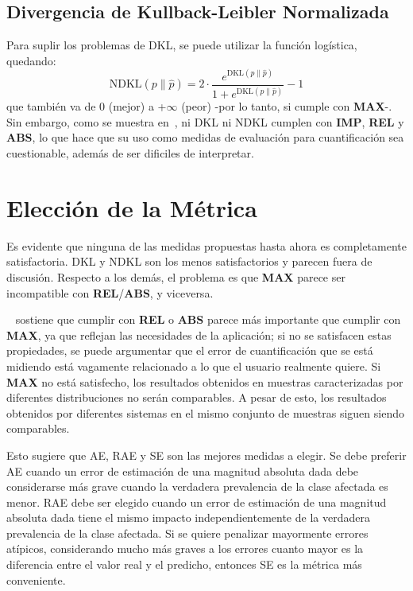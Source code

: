 \subsection{Divergencia de Kullback-Leibler Normalizada}

Para suplir los problemas de DKL, se puede utilizar la función logística,
quedando:
\begin{equation}
    {\text{NDKL}}(p\parallel \hat{p}) = 2 \cdot \frac{e^{{\text{DKL}}(p\parallel \hat{p})}}{1+e^{{\text{DKL}}(p\parallel \hat{p})}}-1
\end{equation}
que también va de {0} (mejor) a {+$\infty$} (peor) -por lo tanto, si cumple con
{\bf MAX}-. Sin embargo, como se muestra en~\cite{sebastiani2020evaluation}, ni
DKL ni NDKL cumplen con {\bf IMP}, {\bf REL} y {\bf ABS}, lo que hace que su uso
como medidas de evaluación para cuantificación sea cuestionable, además de ser
dificiles de interpretar.

\section{Elección de la Métrica}\label{evaluacion:eleccion}

Es evidente que ninguna de las medidas propuestas hasta ahora es completamente
satisfactoria. DKL y NDKL son los menos satisfactorios y parecen fuera de
discusión. Respecto a los demás, el problema es que {\bf MAX} parece ser
incompatible con {\bf REL}/{\bf ABS}, y viceversa.

~\citet{sebastiani2020evaluation} sostiene que cumplir con {\bf REL} o {\bf ABS}
parece más importante que cumplir con {\bf MAX}, ya que reflejan las necesidades
de la aplicación; si no se satisfacen estas propiedades, se puede argumentar que
el error de cuantificación que se está midiendo está vagamente relacionado a lo
que el usuario realmente quiere. Si {\bf MAX} no está satisfecho, los resultados
obtenidos en muestras caracterizadas por diferentes distribuciones no serán
comparables. A pesar de esto, los resultados obtenidos por diferentes sistemas
en el mismo conjunto de muestras siguen siendo comparables.

Esto sugiere que AE, RAE y SE son las mejores medidas a elegir. Se debe preferir
AE cuando un error de estimación de una magnitud absoluta dada debe considerarse
más grave cuando la verdadera prevalencia de la clase afectada es menor. RAE
debe ser elegido cuando un error de estimación de una magnitud absoluta dada
tiene el mismo impacto independientemente de la verdadera prevalencia de la
clase afectada. Si se quiere penalizar mayormente errores atípicos, considerando
mucho más graves a los errores cuanto mayor es la diferencia entre el valor real
y el predicho, entonces SE es la métrica más conveniente.


